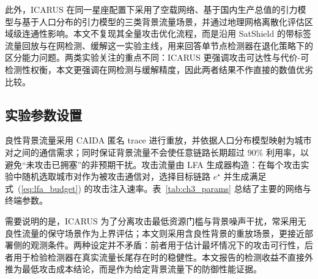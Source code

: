 此外，ICARUS 在同一星座配置下采用了空载网络、基于国内生产总值的引力模型与基于人口分布的引力模型的三类背景流量场景，并通过地理网格离散化评估区域级连通性影响。本文不复现其全量攻击优化流程，而是沿用 SatShield 的带标签流量回放与在网检测、缓解这一实验主线，用来回答单节点检测器在退化策略下的区分能力问题。两类实验关注的重点不同：ICARUS 更强调攻击可达性与代价-可检测性权衡，本文更强调在网检测与缓解精度，因此两者结果不作直接的数值优劣比较。

\subsection{实验参数设置}
良性背景流量采用 CAIDA 匿名 trace 进行重放，并依据人口分布模型映射为城市对之间的通信需求；同时保证背景流量不会使任意链路长期超过 $90\%$ 利用率，以避免“未攻击已拥塞”的非预期干扰。攻击流量由 LFA 生成器构造：在每个攻击实验中随机选取城市对作为被攻击通信对，选择目标链路 $e^\star$ 并生成满足式~(\ref{eq:lfa_budget}) 的攻击注入速率。表~\ref{tab:ch3_params} 总结了主要的网络与终端参数。

需要说明的是，ICARUS 为了分离攻击最低资源门槛与背景噪声干扰，常采用无良性流量的保守场景作为上界评估；本文则采用含良性背景的重放场景，更接近部署侧的观测条件。两种设定并不矛盾：前者用于估计最坏情况下的攻击可行性，后者用于检验检测器在真实流量长尾存在时的稳健性。本文报告的检测收益不直接外推为最低攻击成本结论，而是作为给定背景流量下的防御性能证据。


